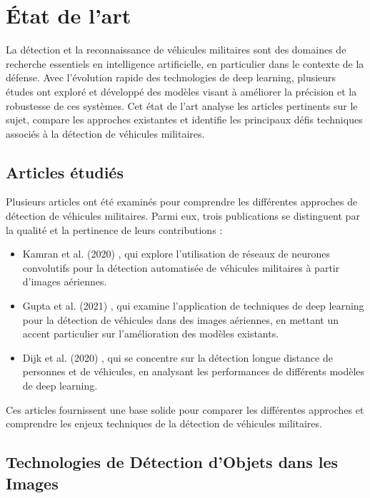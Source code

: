\chapter{État de l'art}
\label{chap:2}

La détection et la reconnaissance de véhicules militaires sont des domaines de recherche essentiels en intelligence artificielle, en particulier dans le contexte de la défense. Avec l'évolution rapide des technologies de deep learning, plusieurs études ont exploré et développé des modèles visant à améliorer la précision et la robustesse de ces systèmes. Cet état de l'art analyse les articles pertinents sur le sujet, compare les approches existantes et identifie les principaux défis techniques associés à la détection de véhicules militaires.

\section{Articles étudiés}

Plusieurs articles ont été examinés pour comprendre les différentes approches de détection de véhicules militaires. Parmi eux, trois publications se distinguent par la qualité et la pertinence de leurs contributions :

\begin{itemize}
    \item Kamran et al. (2020) \cite{kamran2020}, qui explore l'utilisation de réseaux de neurones convolutifs pour la détection automatisée de véhicules militaires à partir d'images aériennes.
    \item Gupta et al. (2021) \cite{gupta2021}, qui examine l'application de techniques de deep learning pour la détection de véhicules dans des images aériennes, en mettant un accent particulier sur l'amélioration des modèles existants.
    \item Dijk et al. (2020) \cite{spie2020}, qui se concentre sur la détection longue distance de personnes et de véhicules, en analysant les performances de différents modèles de deep learning.
\end{itemize}

Ces articles fournissent une base solide pour comparer les différentes approches et comprendre les enjeux techniques de la détection de véhicules militaires.



\section{Technologies de Détection d'Objets dans les Images}


